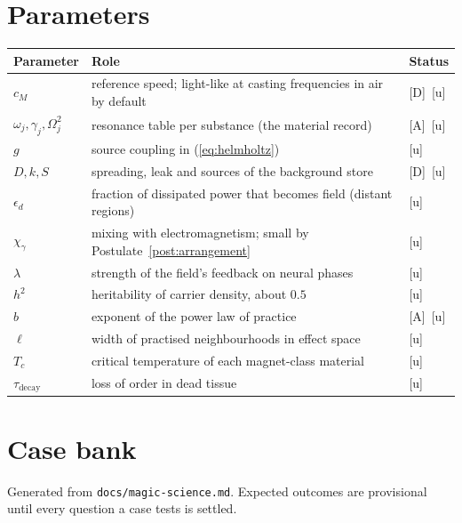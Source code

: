 \documentclass[11pt,a4paper]{article}
\numberwithin{equation}{section}
\theoremstyle{definition}
\theoremstyle{plain}
\theoremstyle{remark}
\newcommand{\cM}{c_{M}}
\newcommand{\tagD}{\textcolor{tag}{\textsf{[D]}}}
\newcommand{\tagA}{\textcolor{tag}{\textsf{[A]}}}
\newcommand{\tagU}{\textcolor{tag}{\textsf{[u]}}}
\begin{document}
\appendix
\section{Parameters}
\begin{center}\small
\begin{tabularx}{\textwidth}{@{}l>{\raggedright\arraybackslash}Xl@{}}
\toprule
Parameter & Role & Status\\
\midrule
$\cM$ & reference speed; light-like at casting frequencies in air by default & \tagD\ \tagU\\
$\omega_j,\gamma_j,\Omega_j^2$ & resonance table per substance (the material record) & \tagA\ \tagU\\
$g$ & source coupling in (\ref{eq:helmholtz}) & \tagU\\
$D,k,S$ & spreading, leak and sources of the background store & \tagD\ \tagU\\
$\epsilon_d$ & fraction of dissipated power that becomes field (distant regions) & \tagU\\
$\chi_\gamma$ & mixing with electromagnetism; small by Postulate~\ref{post:arrangement} & \tagU\\
$\lambda$ & strength of the field's feedback on neural phases & \tagU\\
$h^2$ & heritability of carrier density, about $0.5$ & \tagU\\
$b$ & exponent of the power law of practice & \tagA\ \tagU\\
$\ell$ & width of practised neighbourhoods in effect space & \tagU\\
$T_c$ & critical temperature of each magnet-class material & \tagU\\
$\tau_{\text{decay}}$ & loss of order in dead tissue & \tagU\\
\bottomrule
\end{tabularx}
\end{center}

\section{Case bank}\label{app:cases}
Generated from \texttt{docs/magic-science.md}. Expected outcomes are provisional until every question a case tests is settled.

{\small}
\end{document}
